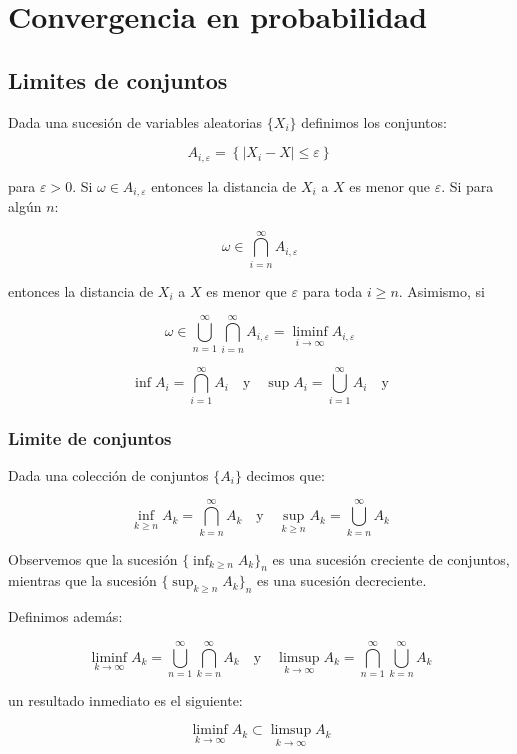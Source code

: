 \documentclass{extreport}
\theoremstyle{definicion}
\theoremstyle{propiedad}
\begin{document}
\section{Convergencia en probabilidad}

\subsection{Limites de conjuntos}

Dada una sucesión de variables aleatorias $\{X_i\}$ definimos los conjuntos:

$$
A_{i,\varepsilon}=\left\{\left|X_i-X\right\vert\leq\varepsilon\right\}
$$

para $\varepsilon>0$. Si $\omega \in A_{i,\varepsilon}$ entonces la distancia de $X_i$ a $X$ es menor que $\varepsilon$.  Si para algún $n$:

$$
\omega \in \bigcap_{i=n}^\infty A_{i,\varepsilon}
$$

entonces la distancia de $X_i$ a  $X$ es menor que $\varepsilon$ para toda $i\geq n$. Asimismo, si

$$
\omega \in \bigcup_{n=1}^{\infty}\bigcap_{i=n}^\infty A_{i,\varepsilon} = \liminf_{i\rightarrow \infty}A_{i,\varepsilon}
$$

$$
\inf A_i = \bigcap_{i=1}^\infty A_i \quad \text{y} \quad \sup A_i = \bigcup_{i=1}^\infty A_i \quad \text{y}
$$



\subsubsection{Limite de conjuntos}

Dada una colección de conjuntos $\{A_i\}$  decimos que:

$$
\inf_{k\geq n}A_k = \bigcap_{k=n}^\infty A_k \quad \text{y}\quad \sup_{k\geq n}A_k = \bigcup_{k=n}^\infty A_k
$$

Observemos que la sucesión  $\{\inf_{k\geq n} A_k\}_n$ es una sucesión creciente de conjuntos, mientras que la sucesión $\{\sup_{k\geq n}A_k\}_n$ es una sucesión decreciente.

Definimos además:

$$
\liminf_{k\rightarrow\infty} A_k = \bigcup_{n=1}^\infty\bigcap_{k=n}^\infty A_k\quad\text{y}\quad\limsup_{k\rightarrow\infty} A_k = \bigcap_{n=1}^\infty\bigcup_{k=n}^\infty A_k
$$

un resultado inmediato es el siguiente:

$$
\liminf_{k\rightarrow\infty}A_k \subset \limsup_{k\rightarrow\infty} A_k
$$
\end{document}
